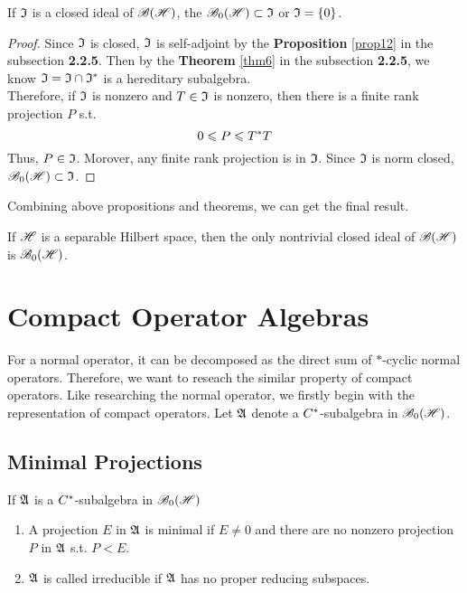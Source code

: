 \begin{prop}
	If $\mathfrak{I}$ is a closed ideal of $\mathscr{B(H)}$, the $\mathscr{B}_{0}\mathscr{(H)} \subset \mathfrak{I}$ or $\mathfrak{I} = \{0\}$.
\end{prop}
\begin{proof}
	Since $\mathfrak{I}$ is closed, $\mathfrak{I}$ is self-adjoint by the  \textbf{Proposition} \ref{prop12} in the subsection \textbf{2.2.5}. Then by the \textbf{Theorem} \ref{thm6} in the subsection \textbf{2.2.5}, we know $\mathfrak{I} = \mathfrak{I} \cap \mathfrak{I}^{*}$ is a hereditary subalgebra. \\
	Therefore, if $\mathfrak{I}$ is nonzero and $T \in \mathfrak{I}$ is nonzero, then there is a finite rank projection $P$ s.t.
	\begin{equation*}
		0 \leqslant P \leqslant T^{*}T
	\end{equation*}
	Thus, $P \in \mathfrak{I}$. Morover, any finite rank projection is in $\mathfrak{I}$. Since $\mathfrak{I}$ is norm closed, $\mathscr{B}_{0}\mathscr{(H)} \subset \mathfrak{I}$.
\end{proof}

Combining above propositions and theorems, we can get the final result.
\begin{cor}
	If $\mathscr{H}$ is a separable Hilbert space, then the only nontrivial closed ideal of $\mathscr{B(H)}$ is $\mathscr{B}_{0}\mathscr{(H)}$.
\end{cor}

\section{Compact Operator Algebras}

For a normal operator, it can be decomposed as the direct sum of $*$-cyclic normal operators. Therefore, we want to reseach the similar property of compact operators. Like researching the normal operator, we firstly begin with the representation of compact operators. Let $\mathfrak{A}$ denote a $C^{*}$-subalgebra in $\mathscr{B}_{0}\mathscr{(H)}$.

\subsection{Minimal Projections}

\begin{defn}
	If $\mathfrak{A}$ is a $C^{*}$-subalgebra in $\mathscr{B}_{0}\mathscr{(H)}$
	\begin{enumerate}[label=\arabic*)]
		\item A projection $E$ in $\mathfrak{A}$ is minimal if $E \neq 0$ and there are no nonzero projection $P$ in $\mathfrak{A}$ s.t. $P < E$.
		\item $\mathfrak{A}$ is called irreducible if $\mathfrak{A}$ has no proper reducing subspaces.
	\end{enumerate}
\end{defn}

